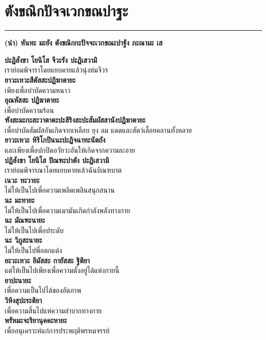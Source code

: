 \documentclass[12pt]{article}
\begin{document}
\section{ตังขณิกปัจจเวกขณปาฐะ}
\hrule
\begin{center}
\textbf{(นำ) หันทะ มะยัง ตังขณิกกะปัจจะเวกขณะปาฐัง ภะณามะ เส}
\end{center}
\textbf{ปะฏิสังขา โยนิโส จีวะรัง ปะฏิเสวามิ\\}
\indent เราย่อมพิจาราโดยแยบคายแล้วนุ่งห่มจีวร\\
\textbf{ยาวะเทวะสีตัสสะปฏิฆาตายะ\\}
\indent เพียงเพื่อบำบัดความหนาว\\
\textbf{อุณหัสสะ ปฏิฆาตายะ\\}
\indent เพื่อบำบัดความร้อน\\
\textbf{ฑังสะมะกะสะวาตาตะปะสิริงสะปะสัมผัสสานังปฏิฆาตายะ\\}
\indent เพื่อบำบัดสัมผัสอันเกิดจากเหลือบ ยุง ลม แดดและสัตว์เลื้อยคลานทั้งหลาย\\
\textbf{ยาวะเทวะ หิริโกปินนะปะฏิจฉาทะนัตถัง\\}
\indent และเพียงเพื่อปกปิดอวัยวะอันให้เกิดจากความละอาย\\
\textbf{ปฏิสังขา โยนิโส ปิณฑะปาตัง ปะฏิเสวามิ\\}
\indent เราย่อมพิจารณาโดยแยบคายแล้วฉันบิณฑบาต\\
\textbf{เนวะ ทะวายะ\\}
\indent ไม่ให้เป็นไปเพื่อความเพลิดเพลินสนุกสนาน\\
\textbf{นะ มะทายะ\\}
\indent ไม่ให้เป็นไปเพื่อความเมามันเกิดกำลังพลังทางกาย\\
\textbf{นะ มัณฑะนายะ\\}
\indent ไม่ให้เป็นไปเพื่อประดับ\\
\textbf{นะ วิภูสะนายะ\\}
\indent ไม่ให้เป็นไปพื่อตกแต่ง\\
\textbf{ยะวะเทวะ อิมัสสะ กายัสสะ ฐิติยา\\}
\indent แต่ให้เป็นไปเพียงเพื่อความตั้งอยู่ได้แห่งกายนี้\\
\textbf{ยาปะนายะ\\}
\indent เพื่อความเป็นไปได้ของอัตภาพ\\
\textbf{วิหิงสุปะระติยา\\}
\indent เพื่อความสิ้นไปแห่ความลำบากทางกาย\\
\textbf{พรัหมะจะริยานุคคะหายะ\\}
\indent เพื่ออนุเคราะห์แก่การประพฤติพรหมจรรย์\\
\end{document}
